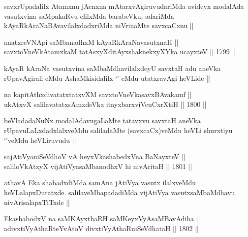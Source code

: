 \begin{artha}
savxrUpadalilx Atamxnu jAcnxna mAtarxvAgiruvudariMda avideyx modalAda
vasutxvina saMpakaRvu elilxMda barabeVku, adariMda
kAyaRkAraNaBAvavilalxdadxriMda niVrinaMte savxcaCxnu ||
\end{artha}


\begin{shl}
anatxreVNApi saMbanadhxM kAyaRkAraNavasutxnaH || \\
savxtoV\s neVkAtamxkaM tatAsxyXditAyxshaknekxyXYka ucayxteV ||  1799 ||  
\end{shl}

\begin{artha}
kAyaR kAraNa vasutxvina saMbaMdhavilalxdeyU savxtaH adu aneVka
rUpavAgirali eMdu AshaMkisidalilx `\stext' eMdu utatxravAgi heVLide ||
\end{artha}

\begin{shl}
na kapitAthxdivatatxtatxvXM savxtoV\s neVkasavxBAvakamf ||  \\
ukAtxvX salilavatatxsAmxdeVka itayxbarxviVcuCxrXtiH ||  1800 ||  
\end{shl}

\begin{artha}
beVladadaNuNx modalAdavugaLaMte tatavxvu savxtaH aneVka
rUpavuLaLxdadxlalxveMdu saliladaMte (savxcaCx)veMdu heVLi shurxtiyu
`\stext'veMdu heVLiruvudu ||
\end{artha}


\begin{shl}
sajAtiVyaniSeVdhoV vA heyxVkashabedxVna BaNayxteV || \\
saliloVkAtxyX vijAtiVyasaMbanodhxV hi nivAritaH ||  1801 ||  
\end{shl}

\begin{artha}
athavA Eka shabadxdiMda samAna jAtiVya vasutx ilalxveMdu
heVLalapxDutatxde. salilaveMbapadadiMda vijAtiVya vasutxsaMbaMdhavu
nivArisalapxTiTxde ||
\end{artha}

\begin{shl}
EkashabodxV na saMKAyxthaRH saMKeyxVyAsaMBavAdiha || \\
adivxtiVyAthaRteYvAtoV divxtiVyAthaRniSeVdhataH ||  1802 ||  
\end{shl}

